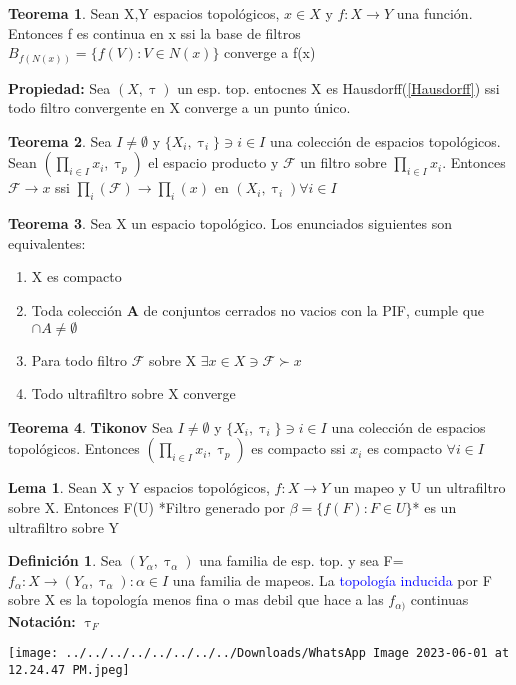 \documentclass{article}
\theoremstyle{definition}
\newtheorem{definition}{Definición}[section]
\newtheorem{theorem}{Teorema}[section]
\newtheorem{lemma}{Lema}[section]
\begin{document}
\begin{theorem}
	Sean X,Y espacios topológicos, $x\in X$  y $f:X\to Y$ una función. Entonces f es continua en x ssi la base de filtros $B_{f(N(x))}=\{f(V):V\in N(x)\}$ converge a f(x)
\end{theorem}
\textbf{Propiedad: } 
Sea $(X,\uptau)$ un esp. top. entocnes X es Hausdorff(\ref{Hausdorff}) ssi todo filtro convergente en X converge a un punto único.
\begin{theorem}
	Sea $I\neq\emptyset$ y $\{X_i,\uptau_i\}\ni i\in I$ una colección de espacios topológicos. Sean $(\prod_{i\in I}x_i,\uptau_p)$ el espacio producto y $\mathcal{F}$ un filtro sobre $\prod_{i\in I}x_i$. Entonces $\mathcal{F}\to x$ ssi $\prod_{i}(\mathcal{F})\to \prod_i(x)$ en $(X_i,\uptau_i) \forall i\in I$
\end{theorem}
\begin{theorem}
	Sea X un espacio topológico. Los enunciados siguientes son equivalentes:
	\begin{enumerate}
		\item X es compacto
		\item Toda colección \textbf{A} de conjuntos cerrados no vacios con la PIF, cumple que $\cap A\neq\emptyset$
		\item Para todo filtro $\mathcal{F}$ sobre X $\exists x\in X\ni \mathcal{F} \succ x$
		\item Todo ultrafiltro sobre X converge
	\end{enumerate}
\end{theorem}
\begin{theorem}\textbf{Tikonov}
	Sea $I\neq\emptyset$ y $\{X_i,\uptau_i\}\ni i\in I$ una colección de espacios topológicos. Entonces $(\prod_{i\in I}x_i,\uptau_p)$ es compacto ssi $x_i$ es compacto $\forall i \in I$
\end{theorem}
\begin{lemma}
	Sean X y Y espacios topológicos, $f:X\to Y$ un mapeo y U un ultrafiltro sobre X. Entonces F(U) *Filtro generado por $\beta = \{f(F):F\in U\}$* es un ultrafiltro sobre Y
\end{lemma}
\begin{definition}
	Sea $(Y_{\alpha},\uptau_{\alpha})$ una familia de esp. top. y sea F={$f_{\alpha}: X\to (Y_{\alpha},\uptau_{\alpha}): \alpha\in I$} una familia de mapeos. La \textcolor{blue}{topología inducida} por F sobre X es la topología menos fina o mas debil que hace a las $f_{\alpha)}$ continuas\\
\textbf{Notación: } $\uptau_F$
\end{definition}
\texttt{[image: ../../../../../../../../Downloads/WhatsApp Image 2023-06-01 at 12.24.47 PM.jpeg]} \\
\end{document}
